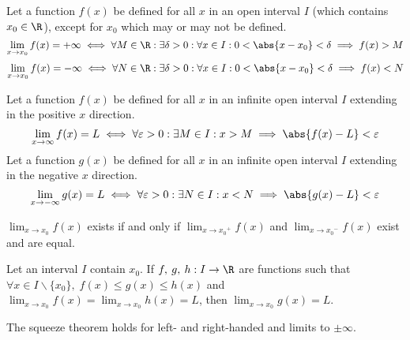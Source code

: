 \documentclass{article}
\begin{document}
%
\begin{definition}
    Let a function \(f(x)\) be defined for all \(x\) in an open interval \(I\)
    (which contains \(x_0 \in \R\)), except for \(x_0\) which may or may not be defined.
    \begin{equation*}
        \lim_{x\to x_0} f(x) = +\infty \iff \forall M \in \R: \exists\delta>0: \forall x \in I: 0<\abs{x-x_0}<\delta \implies f(x) > M
    \end{equation*}
    \begin{equation*}
        \lim_{x\to x_0} f(x) = -\infty \iff \forall N \in \R: \exists\delta>0: \forall x \in I: 0<\abs{x-x_0}<\delta \implies f(x) < N
    \end{equation*}
\end{definition}
%
\begin{definition}
    Let a function \(f(x)\) be defined for all \(x\) in an infinite open interval \(I\)
    extending in the positive \(x\) direction.
    \begin{equation*}
        \lim_{x\to\infty} f(x) = L \iff \forall \varepsilon>0: \exists M \in I: x>M \implies \abs{f(x)-L}<\varepsilon
    \end{equation*}
    Let a function \(g(x)\) be defined for all \(x\) in an infinite open interval \(I\)
    extending in the negative \(x\) direction.
    \begin{equation*}
        \lim_{x\to-\infty} g(x) = L \iff \forall \varepsilon>0: \exists N \in I: x<N \implies \abs{g(x)-L}<\varepsilon
    \end{equation*}
\end{definition}
%
\begin{theorem}
    \(\displaystyle\lim_{x\to x_0} f(x)\) exists if and only if
    \(\displaystyle\lim_{x\to {x_0}^+} f(x)\) and \(\displaystyle\lim_{x\to {x_0}^-} f(x)\)
    exist and are equal.
\end{theorem}
%
\begin{theorem}
    Let an interval \(I\) contain \(x_0\).
    If \(f,\:g,\:h : I \to \R\) are functions such that
    \(\forall x \in I\backslash\{x_0\},\; f(x)\leqslant g(x)\leqslant h(x)\)
    and
    \(\displaystyle\lim_{x\to x_0} f(x) = \lim_{x\to x_0} h(x) = L\),
    then
    \(\displaystyle\lim_{x\to x_0} g(x) = L\).
\end{theorem}
%
\begin{note}
    The squeeze theorem holds for left- and right-handed and limits to \(\pm\infty\).
\end{note}
\end{document}
